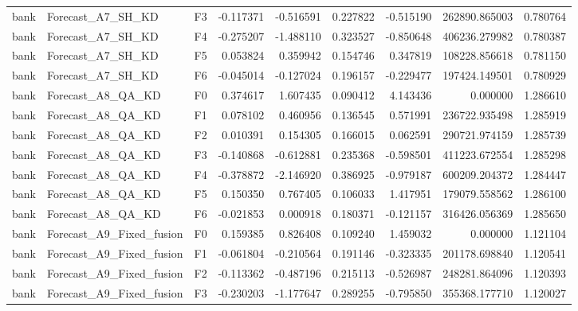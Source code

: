 \begin{tabular}{lllrrrrrr}
      bank &            Forecast\_A7\_SH\_KD &  F3 & -0.117371 & -0.516591 & 0.227822 & -0.515190 &    262890.865003 &             0.780764 \\
      bank &            Forecast\_A7\_SH\_KD &  F4 & -0.275207 & -1.488110 & 0.323527 & -0.850648 &    406236.279982 &             0.780387 \\
      bank &            Forecast\_A7\_SH\_KD &  F5 &  0.053824 &  0.359942 & 0.154746 &  0.347819 &    108228.856618 &             0.781150 \\
      bank &            Forecast\_A7\_SH\_KD &  F6 & -0.045014 & -0.127024 & 0.196157 & -0.229477 &    197424.149501 &             0.780929 \\
      bank &            Forecast\_A8\_QA\_KD &  F0 &  0.374617 &  1.607435 & 0.090412 &  4.143436 &         0.000000 &             1.286610 \\
      bank &            Forecast\_A8\_QA\_KD &  F1 &  0.078102 &  0.460956 & 0.136545 &  0.571991 &    236722.935498 &             1.285919 \\
      bank &            Forecast\_A8\_QA\_KD &  F2 &  0.010391 &  0.154305 & 0.166015 &  0.062591 &    290721.974159 &             1.285739 \\
      bank &            Forecast\_A8\_QA\_KD &  F3 & -0.140868 & -0.612881 & 0.235368 & -0.598501 &    411223.672554 &             1.285298 \\
      bank &            Forecast\_A8\_QA\_KD &  F4 & -0.378872 & -2.146920 & 0.386925 & -0.979187 &    600209.204372 &             1.284447 \\
      bank &            Forecast\_A8\_QA\_KD &  F5 &  0.150350 &  0.767405 & 0.106033 &  1.417951 &    179079.558562 &             1.286100 \\
      bank &            Forecast\_A8\_QA\_KD &  F6 & -0.021853 &  0.000918 & 0.180371 & -0.121157 &    316426.056369 &             1.285650 \\
      bank &     Forecast\_A9\_Fixed\_fusion &  F0 &  0.159385 &  0.826408 & 0.109240 &  1.459032 &         0.000000 &             1.121104 \\
      bank &     Forecast\_A9\_Fixed\_fusion &  F1 & -0.061804 & -0.210564 & 0.191146 & -0.323335 &    201178.698840 &             1.120541 \\
      bank &     Forecast\_A9\_Fixed\_fusion &  F2 & -0.113362 & -0.487196 & 0.215113 & -0.526987 &    248281.864096 &             1.120393 \\
      bank &     Forecast\_A9\_Fixed\_fusion &  F3 & -0.230203 & -1.177647 & 0.289255 & -0.795850 &    355368.177710 &             1.120027 \\

\end{tabular}
